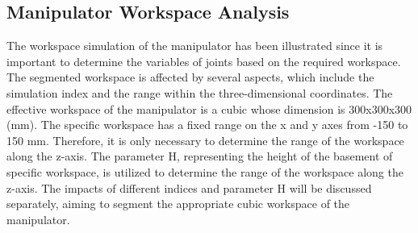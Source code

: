 \subsection{Manipulator Workspace Analysis}
The workspace simulation of the manipulator has been illustrated since it is important to determine the 
variables of joints based on the required workspace. The segmented workspace is affected by several aspects, 
which include the simulation index and the range within the three-dimensional coordinates. The effective workspace 
of the manipulator is a cubic whose dimension is 300x300x300 (mm). The specific workspace has a fixed range on 
the x and y axes from -150 to 150 mm. Therefore, it is only necessary to determine the range of the workspace 
along the z-axis. The parameter H, representing the height of the basement of specific workspace, is 
utilized to determine the range of the workspace along the z-axis. The impacts of different indices and 
parameter H will be discussed separately, aiming to segment the appropriate cubic workspace of the manipulator.
